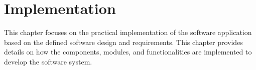 \chapter{Implementation}
This chapter focuses on the practical implementation of the software application based on the defined software design and requirements.
This chapter provides details on how the components, modules, and functionalities are implemented to develop the software system.







